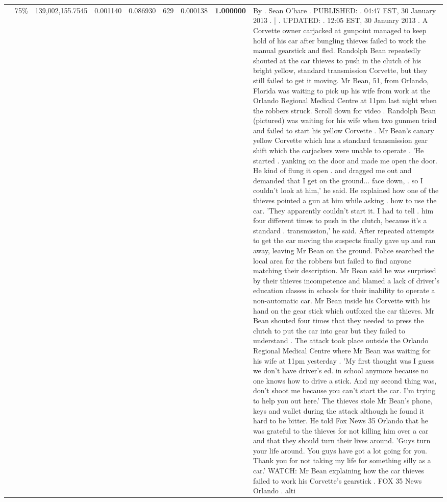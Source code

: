 \begin{table}[H]
\begin{tabular}{llrrrrrrl}
 & 75\% & 139,002,155.7545 & 0.001140 & 0.086930 & \color{red} 629 & 0.000138 & \bfseries \color{red} 1.000000 & By . Sean O'hare . PUBLISHED: . 04:47 EST, 30 January 2013 . | . UPDATED: . 12:05 EST, 30 January 2013 . A Corvette owner carjacked at gunpoint managed to keep hold of his car after bungling thieves failed to work the manual gearstick and fled. Randolph Bean repeatedly shouted at the car thieves to push in the clutch of his bright yellow, standard transmission Corvette, but they still failed to get it moving. Mr Bean, 51, from Orlando, Florida was waiting to pick up his wife from work at the Orlando Regional Medical Centre at 11pm last night when the robbers struck. Scroll down for video . Randolph Bean (pictured) was waiting for his wife when two gunmen tried and failed to start his yellow Corvette . Mr Bean's canary yellow Corvette which has a standard transmission gear shift which the carjackers were unable to operate . 'He started . yanking on the door and made me open the door. He kind of flung it open . and dragged me out and demanded that I get on the ground... face down, . so I couldn't look at him,' he said. He explained how one of the thieves pointed a gun at him while asking . how to use the car. 'They apparently couldn't start it. I had to tell . him four different times to push in the clutch, because it's a standard . transmission,' he said. After repeated attempts to get the car moving the suspects finally gave up and ran away, leaving Mr Bean on the ground. Police searched the local area for the robbers but failed to find anyone matching their description. Mr Bean said he was surprised by their thieves incompetence and blamed a lack of driver's education classes in schools for their inability to operate a non-automatic car. Mr Bean inside his Corvette with his hand on the gear stick which outfoxed the car thieves. Mr Bean shouted four times that they needed to press the clutch to put the car into gear but they failed to understand . The attack took place outside the Orlando Regional Medical Centre where Mr Bean was waiting for his wife at 11pm yesterday . 'My first thought was I guess we don't have driver's ed. in school anymore because no one knows how to drive a stick. And my second thing was, don't shoot me because you can't start the car. I'm trying to help you out here.' The thieves stole Mr Bean's phone, keys and wallet during the attack although he found it hard to be bitter. He told Fox News 35 Orlando that he was grateful to the thieves for not killing him over a car and that they should turn their lives around. 'Guys turn your life around. You guys have got a lot going for you. Thank you for not taking my life for something silly as a car.' WATCH: Mr Bean explaining how the car thieves failed to work his Corvette's gearstick . FOX 35 News Orlando . alti \\

\end{tabular}
\end{table}
